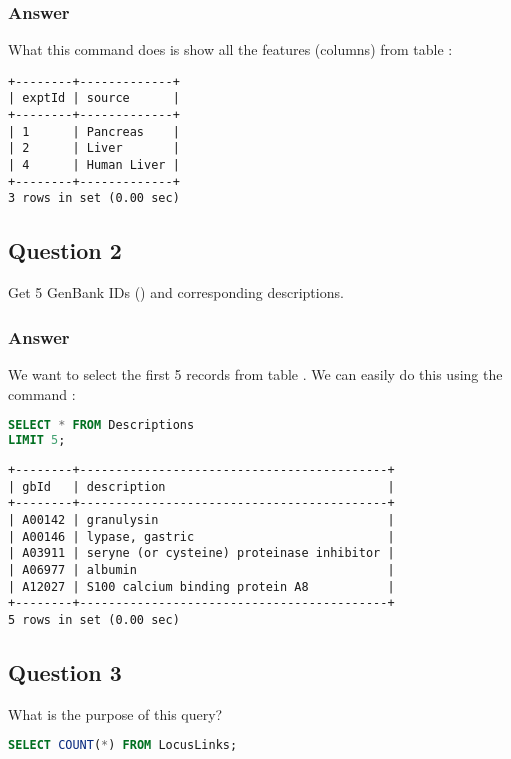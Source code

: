 \subsubsection*{Answer}
What this command does is show all the features (columns) from table :

\begin{lstlisting}[style=output]
+--------+-------------+
| exptId | source      |
+--------+-------------+
| 1      | Pancreas    |
| 2      | Liver       |
| 4      | Human Liver |
+--------+-------------+
3 rows in set (0.00 sec)
\end{lstlisting}

\subsection*{Question 2}
Get 5 GenBank IDs () and corresponding descriptions.

\subsubsection*{Answer}
We want to select the first 5 records from table . We can easily do this using the command :
\begin{lstlisting}[language=sql]
SELECT * FROM Descriptions
LIMIT 5;
\end{lstlisting}

\begin{lstlisting}[style=output]
+--------+-------------------------------------------+
| gbId   | description                               |
+--------+-------------------------------------------+
| A00142 | granulysin                                |
| A00146 | lypase, gastric                           |
| A03911 | seryne (or cysteine) proteinase inhibitor |
| A06977 | albumin                                   |
| A12027 | S100 calcium binding protein A8           |
+--------+-------------------------------------------+
5 rows in set (0.00 sec)
\end{lstlisting}

\subsection*{Question 3}
What is the purpose of this query?

\begin{lstlisting}[language=sql]
SELECT COUNT(*) FROM LocusLinks;
\end{lstlisting}

